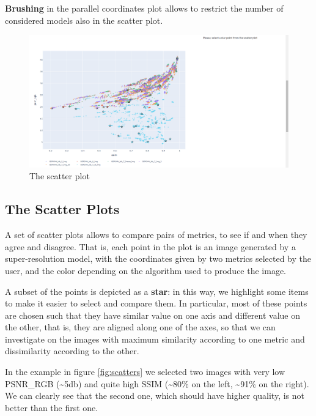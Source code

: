 \documentclass[12pt]{article}
\begin{document}
	\textbf{Brushing} in the parallel coordinates plot allows to restrict the number of considered models also in the scatter plot.


	\begin{figure}[h!]
		\centering
		\includegraphics[width=0.7\linewidth]{imgs/scatter0}
		\caption{The scatter plot}
		\label{fig:scatter0}
	\end{figure}

	\subsection{The Scatter Plots}\label{sec:scatter}

	A set of scatter plots allows to compare pairs of metrics, to see if and when they agree and disagree. That is, each point in the plot is an image generated by a super-resolution model, with the coordinates given by two metrics selected by the user, and the color depending on the algorithm used to produce the image.

	A subset of the points is depicted as a \textbf{star}: in this way, we highlight some items to make it easier to select and compare them. In particular, most of these points are chosen such that they have similar value on one axis and different value on the other, that is, they are aligned along one of the axes, so that we can investigate on the images with maximum similarity according to one metric and dissimilarity according to the other.

	In the example in figure \ref{fig:scatters} we selected two images with very low PSNR\_RGB (\textasciitilde 5db) and quite high SSIM (\textasciitilde 80\% on the left, \textasciitilde 91\% on the right). We can clearly see that the second one, which should have higher quality, is not better than the first one.
\end{document}
